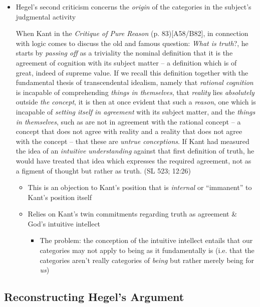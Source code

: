\documentclass[12pt]{article}
\begin{document}
\begin{itemize}
\item Hegel's second criticism concerns the \emph{origin} of the categories in the
subject's judgmental activity

\begin{quote-b}
When Kant in the \emph{Critique of Pure Reason} (p. 83)[A58/B82], in connection
with logic comes to discuss the old and famous question: \emph{What is truth}?, he
starts by \emph{passing off} as a triviality the nominal definition that it is the
agreement of cognition with its subject matter – a definition which is of
great, indeed of supreme value. If we recall this definition together with
the fundamental thesis of transcendental idealism, namely that \emph{rational
cognition} is incapable of comprehending \emph{things in themselves}, that \emph{reality}
lies \emph{absolutely} outside \emph{the concept}, it is then at once evident that such a
\emph{reason}, one which is incapable of \emph{setting itself in agreement} with its
subject matter, and the \emph{things in themselves}, such as are not in agreement
with the rational concept – a concept that does not agree with reality and a
reality that does not agree with the concept – that these are \emph{untrue
conceptions}. If Kant had measured the idea of an \emph{intuitive understanding}
against that first definition of truth, he would have treated that idea
which expresses the required agreement, not as a figment of thought but
rather as truth. (SL 523; 12:26)
\end{quote-b}

\begin{itemize}
\item This is an objection to Kant's position that is \emph{internal} or ``immanent'' to
Kant's position itself
\item Relies on Kant's twin commitments regarding truth as agreement \&
God's intuitive intellect
\begin{itemize}
\item The problem: the conception of the intuitive intellect entails that
our categories may not apply to being as it fundamentally is (i.e. that
the categories aren't really categories of \emph{being} but rather merely
being for \emph{us})
\end{itemize}
\end{itemize}
\end{itemize}


\subsection{Reconstructing Hegel's Argument}
\label{sec:org0b7fb1a}
\end{document}
